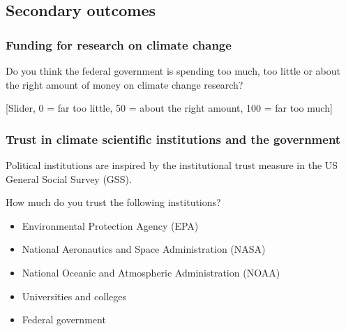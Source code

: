 \documentclass[
  letterpaper,
  DIV=11,
  numbers=noendperiod]{scrartcl}
\providecommand{\tightlist}{%
  \setlength{\itemsep}{0pt}\setlength{\parskip}{0pt}}
\begin{document}
\subsection{Secondary outcomes}\label{secondary-outcomes}

\subsubsection{Funding for research on climate
change}\label{funding-for-research-on-climate-change}

Do you think the federal government is spending too much, too little or
about the right amount of money on climate change research?

{[}Slider, 0 = far too little, 50 = about the right amount, 100 = far
too much{]}

\subsubsection{Trust in climate scientific institutions and the
government}\label{trust-in-climate-scientific-institutions-and-the-government}

\begin{tcolorbox}[enhanced jigsaw, toprule=.15mm, toptitle=1mm, colframe=quarto-callout-note-color-frame, leftrule=.75mm, rightrule=.15mm, bottomtitle=1mm, coltitle=black, colbacktitle=quarto-callout-note-color!10!white, bottomrule=.15mm, breakable, opacityback=0, titlerule=0mm, title=\textcolor{quarto-callout-note-color}{\faInfo}\hspace{0.5em}{Note}, left=2mm, arc=.35mm, opacitybacktitle=0.6, colback=white]

Political institutions are inspired by the institutional trust measure
in the US General Social Survey (GSS).

\end{tcolorbox}

How much do you trust the following institutions?

\begin{itemize}
\tightlist
\item
  Environmental Protection Agency (EPA)
\item
  National Aeronautics and Space Administration (NASA)
\item
  National Oceanic and Atmospheric Administration (NOAA)
\item
  Universities and colleges
\item
  Federal government
\end{itemize}
\end{document}

